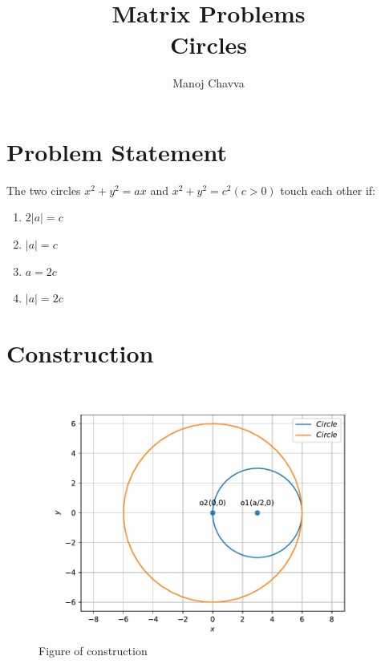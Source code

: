 \documentclass[journal,12pt,twocolumn]{IEEEtran}
\title{Matrix Problems \textbf{\\Circles }}
\author{Manoj Chavva}
\begin{document}
\maketitle



\section{Problem Statement}

\noindent The two circles $x^2+y^2=ax$ and $x^2+y^2=c^2 (c>0)$ touch each other if:
\begin{enumerate}
 
\item $2|a|=c $ 
\item $|a|=c$
\item $a=2c$
\item $|a| =2c$
\end{enumerate}

\section{Construction}
\begin{figure}[h] 
\includegraphics[width=1\columnwidth]{figure.pdf}
\caption{Figure of construction}
\label{fig:triangle}
\end{figure}
\end{document}
